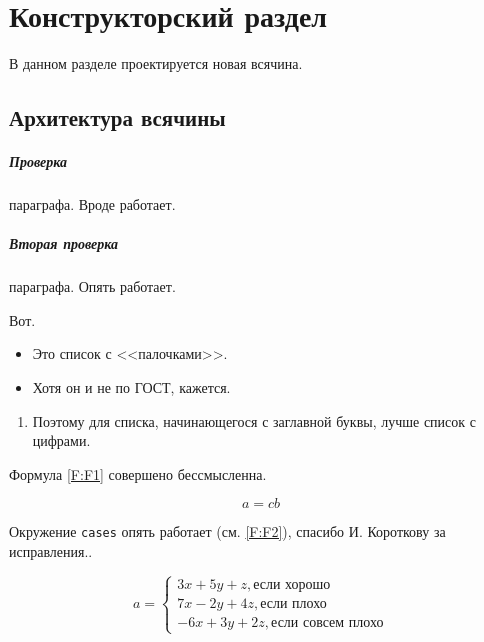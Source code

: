 \chapter{Конструкторский раздел}
\label{cha:design}

В данном разделе проектируется новая всячина.

\section{Архитектура всячины}

\paragraph{Проверка} параграфа. Вроде работает.
\paragraph{Вторая проверка} параграфа. Опять работает.

Вот.

\begin{itemize}
\item Это список с <<палочками>>.
\item Хотя он и не по ГОСТ, кажется.
\end{itemize}

\begin{enumerate}
\item Поэтому для списка, начинающегося с заглавной буквы, лучше список с цифрами.
\end{enumerate}

Формула \ref{F:F1} совершено бессмысленна.


\begin{equation}
a= cb
\label{F:F1}
\end{equation}


Окружение \texttt{cases} опять работает (см. \ref{F:F2}), спасибо И. Короткову за исправления..


\begin{equation}
a= \begin{cases}
 3x + 5y + z, \mbox{если хорошо} \\
 7x - 2y + 4z, \mbox{если плохо}\\
 -6x + 3y + 2z, \mbox{если совсем плохо}
\end{cases}
\label{F:F2}
\end{equation}

